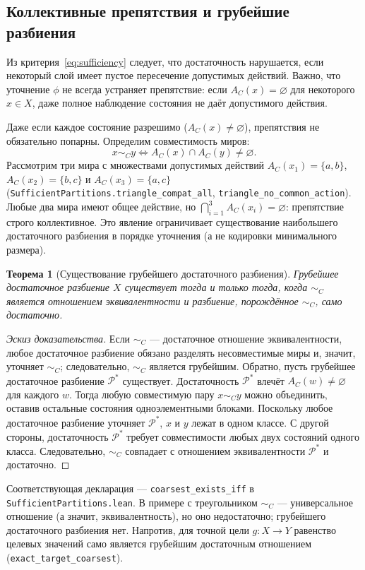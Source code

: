\documentclass[10pt,a4paper]{article}
\newtheorem{theorem}{Теорема}[section]
\begin{document}
\subsection{Коллективные препятствия и грубейшие разбиения}
Из критерия~\eqref{eq:sufficiency} следует, что достаточность нарушается, если некоторый слой имеет пустое пересечение допустимых действий. Важно, что уточнение $\phi$ не всегда устраняет препятствие: если $A_C(x) = \varnothing$ для некоторого $x \in X$, даже полное наблюдение состояния не даёт допустимого действия.

Даже если каждое состояние разрешимо ($A_C(x) \neq \varnothing$), препятствия не обязательно попарны. Определим совместимость миров:
\[
x \sim_C y \iff A_C(x) \cap A_C(y) \neq \varnothing.
\]
Рассмотрим три мира с множествами допустимых действий $A_C(x_1)=\{a,b\}$, $A_C(x_2)=\{b,c\}$ и $A_C(x_3)=\{a,c\}$ (\texttt{SufficientPartitions.triangle\_compat\_all}, \texttt{triangle\_no\_common\_action}). Любые два мира имеют общее действие, но $\bigcap_{i=1}^3 A_C(x_i) = \varnothing$: препятствие строго коллективное. Это явление ограничивает существование наибольшего достаточного разбиения в порядке уточнения (а не кодировки минимального размера).

\begin{theorem}[Существование грубейшего достаточного разбиения]
\label{thm:coarsest}
Грубейшее достаточное разбиение $X$ существует тогда и только тогда, когда $\sim_C$ является отношением эквивалентности и разбиение, порождённое $\sim_C$, само достаточно.
\end{theorem}
\begin{proof}[Эскиз доказательства]
Если $\sim_C$ --- достаточное отношение эквивалентности, любое достаточное разбиение обязано разделять несовместимые миры и, значит, уточняет $\sim_C$; следовательно, $\sim_C$ является грубейшим. Обратно, пусть грубейшее достаточное разбиение $\mathcal{P}^*$ существует. Достаточность $\mathcal{P}^*$ влечёт $A_C(w)\ne\varnothing$ для каждого $w$. Тогда любую совместимую пару $x\sim_C y$ можно объединить, оставив остальные состояния одноэлементными блоками. Поскольку любое достаточное разбиение уточняет $\mathcal{P}^*$, $x$ и $y$ лежат в одном классе. С другой стороны, достаточность $\mathcal{P}^*$ требует совместимости любых двух состояний одного класса. Следовательно, $\sim_C$ совпадает с отношением эквивалентности $\mathcal{P}^*$ и достаточно.
\end{proof}
Соответствующая декларация --- \texttt{coarsest\_exists\_iff} в \texttt{SufficientPartitions.lean}. В примере с треугольником $\sim_C$ --- универсальное отношение (а значит, эквивалентность), но оно недостаточно; грубейшего достаточного разбиения нет. Напротив, для точной цели $g:X\to Y$ равенство целевых значений само является грубейшим достаточным отношением (\texttt{exact\_target\_coarsest}).
\end{document}
